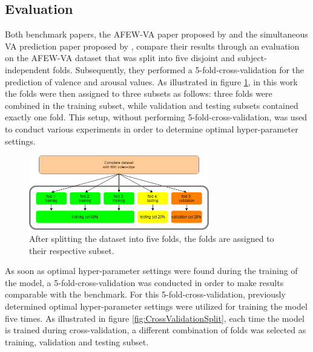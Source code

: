 \subsection{Evaluation}
Both benchmark papers, the AFEW-VA paper proposed by \citet{Kossaifi:2017:AFEW-VADatabase} and the simultaneous VA prediction paper proposed by \citet{Handrich:2020:SimultaneousPredVA}, compare their results through an evaluation on the AFEW-VA dataset that was split into five disjoint and subject-independent folds. Subsequently, they performed a 5-fold-cross-validation for the prediction of valence and arousal values. 
\newline\newline
As illustrated in figure \ref{fig:TrainTestSplit}, in this work the folds were then assigned to three subsets as follows: three folds were combined in the training subset, while validation and testing subsets contained exactly one fold. This setup, without performing 5-fold-cross-validation, was used to conduct various experiments in order to determine optimal hyper-parameter settings.



\begin{figure}[H]
  \begin{center}
  \includegraphics[angle=0, width=0.7\textwidth]{Figures/TrainTestSplit.png}
  \caption{After splitting the dataset into five folds, the folds are assigned to their respective subset.}
  \label{fig:TrainTestSplit}
  \end{center}
\end{figure}

As soon as optimal hyper-parameter settings were found during the training of the model, a 5-fold-cross-validation was conducted in order to make results comparable with the benchmark. For this 5-fold-cross-validation, previously determined optimal hyper-parameter settings were utilized for training the model five times. As illustrated in figure \ref{fig:CrossValidationSplit}, each time the model is trained during cross-validation, a different combination of folds was selected as training, validation and testing subset.\newline

